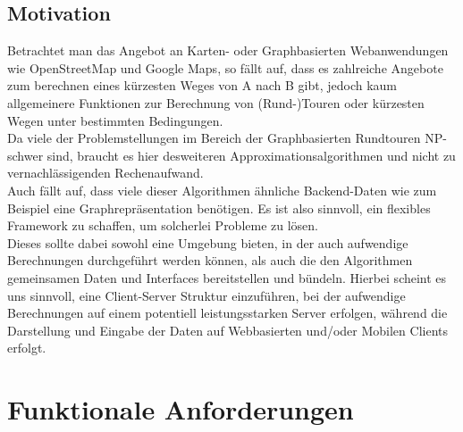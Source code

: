 \documentclass[a4paper,10pt,titlepage]{article}
\begin{document}
\subsection{Motivation}
Betrachtet man das Angebot an Karten- oder Graphbasierten Webanwendungen wie OpenStreetMap und Google Maps, so fällt auf, dass
es zahlreiche Angebote zum berechnen eines kürzesten Weges von A nach B gibt, jedoch kaum allgemeinere Funktionen zur
Berechnung von (Rund-)Touren oder kürzesten Wegen unter bestimmten Bedingungen.\\
Da viele der Problemstellungen im Bereich der Graphbasierten Rundtouren NP-schwer sind, braucht es hier desweiteren Approximationsalgorithmen und
nicht zu vernachlässigenden Rechenaufwand.\\
Auch fällt auf, dass viele dieser Algorithmen ähnliche Backend-Daten wie zum Beispiel eine Graphrepräsentation benötigen. Es ist also sinnvoll, ein flexibles Framework zu schaffen, um solcherlei Probleme zu lösen.\\
Dieses sollte dabei sowohl eine Umgebung bieten, in der auch aufwendige Berechnungen durchgeführt werden können, als auch die den Algorithmen gemeinsamen Daten und Interfaces
bereitstellen und bündeln. Hierbei scheint es uns sinnvoll, eine Client-Server Struktur einzuführen, bei der aufwendige Berechnungen auf einem potentiell leistungsstarken Server erfolgen, während die Darstellung und Eingabe der Daten auf Webbasierten und/oder Mobilen Clients erfolgt.

\section{Funktionale Anforderungen}
\end{document}
